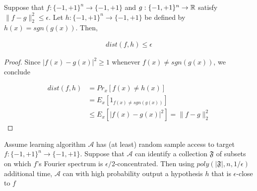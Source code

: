 \documentclass[main.tex]{subfiles}
\begin{document}
\begin{proposition}
\label{prop:odon-331}
Suppose that $f: \{ -1, +1\}^n \rightarrow \{-1, +1\}$ and $g: \{ -1, +1\}^n \rightarrow \mathbb{R}$ satisfy $\| f - g\|^2_2 \leq \epsilon$. Let $h : \{ -1, +1\}^n \rightarrow \{-1, +1\}$ be defined by $h(x) = sgn(g(x))$. Then,

\begin{align*}
dist(f, h) \leq \epsilon	
\end{align*} 

\begin{proof}
Since $| f(x) - g(x)|^2 \geq 1$ whenever $f(x) \neq sgn(g(x))$, we conclude 

\begin{align*}
dist(f, h) &= Pr_x[f(x) \neq h(x)] \\
&= E_x[1_{f(x) \neq sgn(g(x))}] \\
&\leq E_x[|f(x) - g(x)|^2] = \| f - g\|_2^2	
\end{align*}
\end{proof}
\end{proposition}

\begin{theorem}Assume learning algorithm $\mathcal{A}$ has (at least) random sample access to target $f: \{ -1, +1\}^n \rightarrow \{-1, +1\}$. Suppose that $\mathcal{A}$ can identify a collection $\mathfrak{F}$ of subsets on which $f$'s Fourier spectrum is $\epsilon /2$-concentrated. Then using $poly(|\mathfrak{F}|, n, 1/\epsilon)$ additional time, $\mathcal{A}$ can with high probability output a hypothesis $h$ that is $\epsilon$-close to $f$
\end{theorem}
\end{document}
